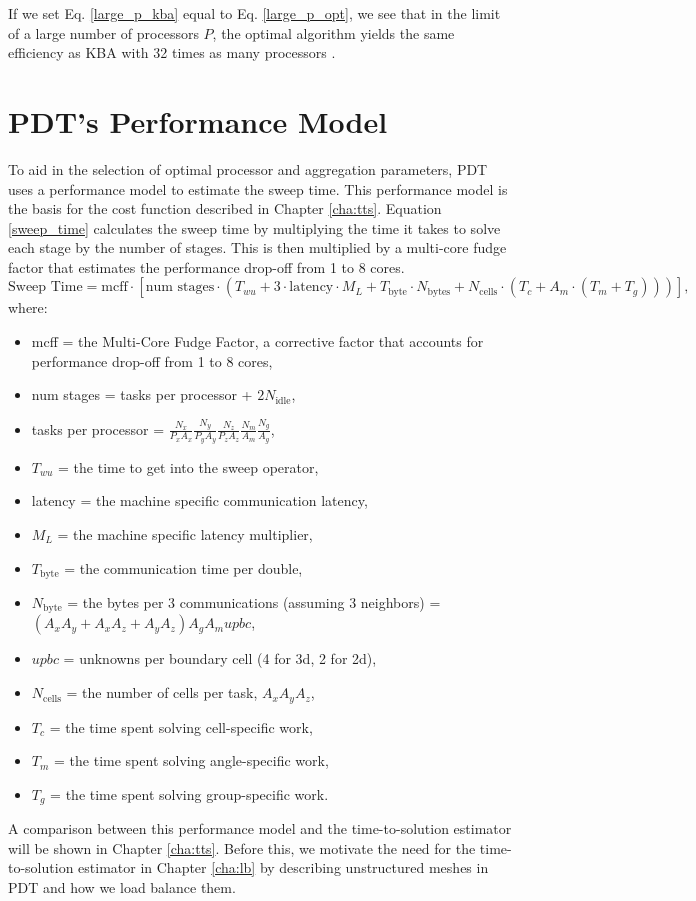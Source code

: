 If we set Eq. \ref{large_p_kba} equal to Eq. \ref{large_p_opt}, we see that in the limit of a large number of processors $P$, the optimal algorithm yields the same efficiency as KBA with 32 times as many processors \cite{mpadams2013, mpadams2015}.

\section{PDT's Performance Model}

To aid in the selection of optimal processor and aggregation parameters, PDT uses a performance model to estimate the sweep time.
This performance model is the basis for the cost function described in Chapter \ref{cha:tts}.
Equation \ref{sweep_time} calculates the sweep time by multiplying the time it takes to solve each stage by the number of stages. This is then multiplied by a multi-core fudge factor that estimates the performance drop-off from 1 to 8 cores.
\begin{equation}
\text{Sweep Time} = \text{mcff}\cdot[\text{num stages}\cdot(T_{wu} + 3\cdot \text{latency}\cdot M_L + T_{\text{byte}}\cdot N_{\text{bytes}} + N_{\text{cells}}\cdot ( T_c +  A_m\cdot (T_m + T_g)))],
\label{sweep_time}
\end{equation}
where:
\begin{itemize}
  \item mcff = the Multi-Core Fudge Factor, a corrective factor that accounts for performance drop-off from 1 to 8 cores,
  \item num stages = tasks per processor + $2N_{\text{idle}}$,
  \item tasks per processor = $\frac{N_x}{P_x A_x} \frac{N_y}{P_y A_y} \frac{N_z}{P_z A_z} \frac{N_m}{A_m} \frac{N_g}{A_g}$,
  \item $T_{wu}$ = the time to get into the sweep operator,
  \item latency = the machine specific communication latency,
  \item $M_L$ = the machine specific latency multiplier,
  \item $T_{\text{byte}}$ = the communication time per double,
  \item $N_{\text{byte}}$ = the bytes per 3 communications (assuming 3 neighbors) = $(A_x A_y + A_x A_z + A_y A_z)A_g A_m upbc $,
  \item $upbc$ = unknowns per boundary cell (4 for 3d, 2 for 2d),
  \item $N_{\text{cells}}$ = the number of cells per task, $A_x A_y A_z$,
  \item $T_c$ = the time spent solving cell-specific work,
  \item $T_m$ = the time spent solving angle-specific work,
  \item $T_g$ = the time spent solving group-specific work.
\end{itemize}

A comparison between this performance model and the time-to-solution estimator will be shown in Chapter \ref{cha:tts}. Before this, we motivate the need for the time-to-solution estimator in Chapter \ref{cha:lb} by describing unstructured meshes in PDT and how we load balance them.
